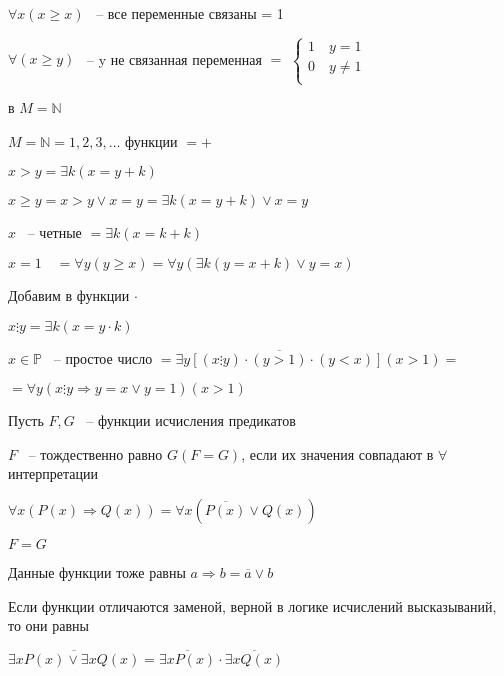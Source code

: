 \documentclass[russian]{lecture-notes}
\begin{document}
	$\forall x (x \geq x)$ ~-- все переменные связаны = 1
	
	$\forall (x \geq y)$ ~-- y не связанная переменная $=$
	$\left \{ 
  		\begin{gathered} 
    			1 \quad y = 1  \\
        		0 \quad y \neq 1 \\          		  	
	  	\end{gathered} 
	\right.$
	
	в $M = \mathbb{N}$


\begin{example}
	$M = \mathbb{N} = { 1, 2, 3, \dots}$ функции  $= +$
	
	$x > y = \exists k (x = y + k)$
	
	$x \geq y = x > y \lor x = y = \exists k (x = y + k)  \lor x = y$
	
	$x$ ~-- четные $= \exists k (x = k + k)$
	
	$x = 1 \quad = \forall y (y \geq x) = \forall y (\exists k (y = x + k) \lor y = x)$
	
	Добавим в функции $\cdot$
	
	$x \vdots y =  \exists k (x = y \cdot k)$
	
	$x \in \mathbb{P}$ ~-- простое число $= \overline{\exists y [(x \vdots y) \cdot (y > 1) \cdot (y < x)]} (x > 1) = $
	
	$= \forall y (x \vdots y \Rightarrow y = x \lor y = 1) (x > 1)$
	
\end{example}

\begin{definition}
	Пусть $F, G$ ~-- функции исчисления предикатов
	
	$F$ ~-- тождественно равно $G (F = G)$, если их значения совпадают в $\forall$ интерпретации
\end{definition}

\begin{example}
	$\forall x (P(x) \Rightarrow Q(x)) = \forall x (\overline{P(x)} \lor Q(x))$
	
	$F = G$
	
	Данные функции тоже равны $a \Rightarrow b = \overline{a} \lor b$
\end{example}

\begin{remark}
	Если функции отличаются заменой, верной в логике исчислений высказываний, то они равны
\end{remark}

\begin{example}
	$\overline{\exists x P(x) \lor \exists x Q(x)} = \overline{\exists x P(x)} \cdot \overline{\exists x Q(x)}$
\end{example}
\end{document}
